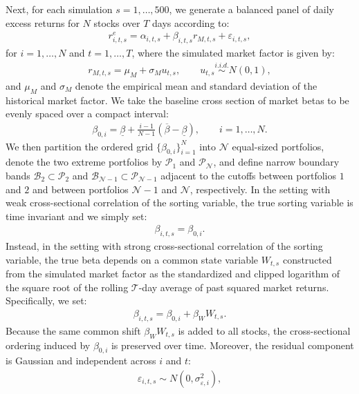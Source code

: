Next, for each simulation $s=1,\dots,500$, we generate a balanced panel of daily excess returns for $N$ stocks over $T$ days according to:
\begin{align*}
    r_{i,t,s}^e = \alpha_{i,t,s} + \beta_{i,t,s} r_{M,t,s} + \varepsilon_{i,t,s},
\end{align*}
for $i=1,\dots,N$ and $t=1,\dots,T$, where the simulated market factor is given by:
\begin{align*}
    r_{M,t,s} = \mu_M + \sigma_M u_{t,s}, \qquad u_{t,s} \overset{i.i.d.}{\sim} N(0,1),
\end{align*}
and $\mu_M$ and $\sigma_M$ denote the empirical mean and standard deviation of the historical market factor. We take the baseline cross section of market betas to be evenly spaced over a compact interval:
\begin{align*}
    \beta_{0,i} = \underline{\beta} + \frac{i-1}{N-1}\left(\overline{\beta}-\underline{\beta}\right), \qquad i=1,\dots,N.
\end{align*}
We then partition the ordered grid $\{\beta_{0,i}\}_{i=1}^N$ into $\mathcal{N}$ equal-sized portfolios, denote the two extreme portfolios by $\mathcal{P}_1$ and $\mathcal{P}_{\mathcal{N}}$, and define narrow boundary bands $\mathcal{B}_2 \subset \mathcal{P}_2$ and $\mathcal{B}_{\mathcal{N}-1} \subset \mathcal{P}_{\mathcal{N}-1}$ adjacent to the cutoffs between portfolios $1$ and $2$ and between portfolios $\mathcal{N}-1$ and $\mathcal{N}$, respectively. In the setting with weak cross-sectional correlation of the sorting variable, the true sorting variable is time invariant and we simply set:
\begin{align*}
    \beta_{i,t,s} = \beta_{0,i}.
\end{align*}
Instead, in the setting with strong cross-sectional correlation of the sorting variable, the true beta depends on a common state variable $W_{t,s}$ constructed from the simulated market factor as the standardized and clipped logarithm of the square root of the rolling $\mathcal{T}$-day average of past squared market returns. Specifically, we set:
\begin{align*}
    \beta_{i,t,s} = \beta_{0,i} + \beta_W W_{t,s}.
\end{align*}
Because the same common shift $\beta_W W_{t,s}$ is added to all stocks, the cross-sectional ordering induced by $\beta_{0,i}$ is preserved over time. Moreover, the residual component is Gaussian and independent across $i$ and $t$:
\begin{align*}
    \varepsilon_{i,t,s} \sim N\left(0,\sigma_{\varepsilon,i}^{2}\right),
\end{align*}
